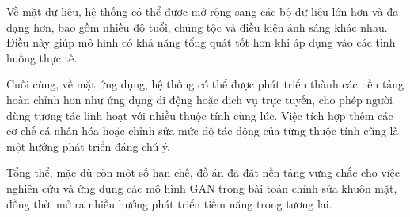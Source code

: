 \documentclass[../DoAn.tex]{subfiles}
\begin{document}
Về mặt dữ liệu, hệ thống có thể được mở rộng sang các bộ dữ liệu lớn hơn và đa dạng hơn, bao gồm nhiều độ tuổi, chủng tộc và điều kiện ánh sáng khác nhau. Điều này giúp mô hình có khả năng tổng quát tốt hơn khi áp dụng vào các tình huống thực tế.

Cuối cùng, về mặt ứng dụng, hệ thống có thể được phát triển thành các nền tảng hoàn chỉnh hơn như ứng dụng di động hoặc dịch vụ trực tuyến, cho phép người dùng tương tác linh hoạt với nhiều thuộc tính cùng lúc. Việc tích hợp thêm các cơ chế cá nhân hóa hoặc chỉnh sửa mức độ tác động của từng thuộc tính cũng là một hướng phát triển đáng chú ý.

Tổng thể, mặc dù còn một số hạn chế, đồ án đã đặt nền tảng vững chắc cho việc nghiên cứu và ứng dụng các mô hình GAN trong bài toán chỉnh sửa khuôn mặt, đồng thời mở ra nhiều hướng phát triển tiềm năng trong tương lai.
\end{document}
